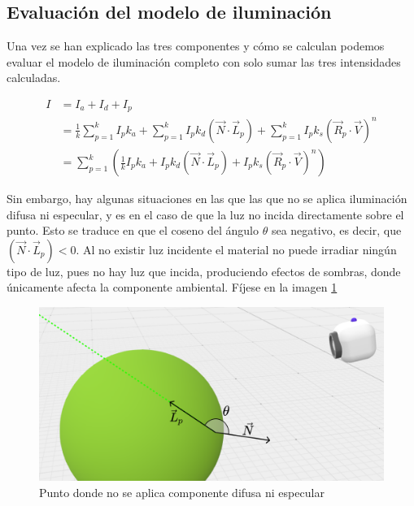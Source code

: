 \subsection{Evaluación del modelo de iluminación}

Una vez se han explicado las tres componentes y cómo se calculan podemos evaluar el modelo de iluminación completo con solo sumar las tres intensidades calculadas.

\begin{equation}
    \label{eq:phong}
    \begin{split}
        I &= I_a + I_d + I_p \\
        &=\frac{1}{k}\sum_{p=1}^k I_p k_a + \sum_{p=1}^{k}I_p k_d (\vec N\cdot \vec L_p) + \sum_{p=1}^{k} I_p k_s (\vec R_p\cdot \vec V)^n \\
        &=\sum_{p=1}^{k}\left(\frac{1}{k}I_p k_a + I_p k_d (\vec N\cdot \vec L_p) +  I_p k_s (\vec R_p\cdot \vec V)^n\right)
    \end{split}
\end{equation}

Sin embargo, hay algunas situaciones en las que las que no se aplica iluminación difusa ni especular, y es en el caso de que la luz no incida directamente sobre el punto. Esto se traduce en que el coseno del ángulo $\theta$ sea negativo, es decir, que $(\vec N\cdot \vec L_p)<0$. Al no existir luz incidente el material no puede irradiar ningún tipo de luz, pues no hay luz que incida, produciendo efectos de sombras, donde únicamente afecta la componente ambiental. Fíjese en la imagen \ref{fig:excepcion}

\begin{figure} [ht]
    \centering
    \includegraphics[scale = 0.25]{img/C7/excepcion.png}
    \caption{Punto donde no se aplica componente difusa ni especular}
    \label{fig:excepcion}
\end{figure}

